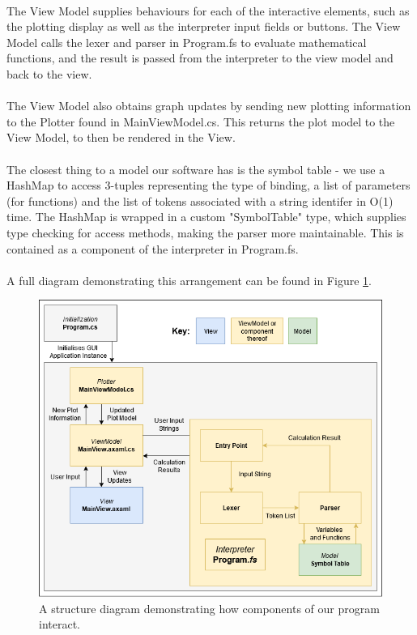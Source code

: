 \documentclass[a4paper, oneside, 11pt]{report}
\begin{document}
    \paragraph{}
    The View Model supplies behaviours for each of the interactive elements, such as the plotting display as well as the interpreter input fields or buttons. The View Model calls the lexer and parser in Program.fs to evaluate mathematical functions, and the result is passed from the interpreter to the view model and back to the view.
    \paragraph{}
    The View Model also obtains graph updates by sending new plotting information to the Plotter found in MainViewModel.cs. This returns the plot model to the View Model, to then be rendered in the View.
    \paragraph{}
    The closest thing to a model our software has is the symbol table - we use a HashMap to access 3-tuples representing the type of binding, a list of parameters (for functions) and the list of tokens associated with a string identifer in O(1) time. The HashMap is wrapped in a custom "SymbolTable" type, which supplies type checking for access methods, making the parser more maintainable. This is contained as a component of the interpreter in Program.fs.
    \paragraph{}
    A full diagram demonstrating this arrangement can be found in Figure \ref{UML}.


    \begin{figure}[htb]
        \includegraphics[width=1.0 \columnwidth]{UML.png}
        \caption{A structure diagram demonstrating how components of our program interact.}
        \label{UML}
    \end{figure}
\end{document}
